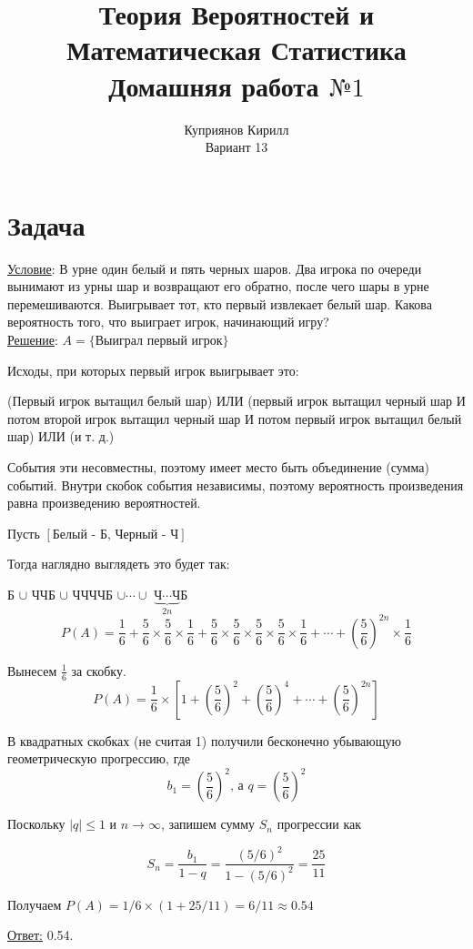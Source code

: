 \documentclass[a4paper,12pt]{article} %
\author{Куприянов Кирилл \\ Вариант 13}
\title{Теория Вероятностей и Математическая Статистика\\Домашняя работа $№1$}
\date{}
\begin{document}
\maketitle
\newpage
\section{Задача}
\underline{Условие}: В урне один белый и пять черных шаров. Два игрока по очереди вынимают из урны шар и возвращают его обратно, после чего шары в урне
перемешиваются. Выигрывает тот, кто первый извлекает белый шар. Какова вероятность того, что выиграет игрок, начинающий игру? \\
\underline{Решение}: $A = \{\text{Выиграл первый игрок}\}$

 Исходы, при которых первый игрок выигрывает это:

(Первый игрок вытащил белый шар) ИЛИ (первый игрок вытащил черный шар И потом второй игрок вытащил черный шар И потом первый игрок вытащил белый шар) ИЛИ (и т. д.)

События эти несовместны, поэтому имеет место быть объединение (сумма) событий. Внутри скобок события независимы, поэтому вероятность произведения равна произведению вероятностей.

Пусть $\left[\text{Белый - Б, Черный - Ч}\right]$

Тогда наглядно выглядеть это будет так:

Б $\cup$ ЧЧБ $\cup$ ЧЧЧЧБ $\cup\cdots\cup$ $\underbrace{\text{Ч}\cdots\text{Ч}}_{2n}$Б
\[
P(A) = \frac{1}{6} + \frac{5}{6}\times\frac{5}{6}\times\frac{1}{6} + \frac{5}{6}\times\frac{5}{6}\times\frac{5}{6}\times\frac{5}{6}\times\frac{1}{6}
+\cdots+\left(\frac{5}{6}\right)^{2n}\times\frac{1}{6}
\]

Вынесем $\frac{1}{6}$ за скобку.
\[
P(A) = \frac{1}{6} \times\left[ 1+\left(\frac{5}{6}\right)^2 + \left(\frac{5}{6}\right)^4 + \cdots + \left(\frac{5}{6}\right)^{2n} \right]
\]

В квадратных  скобках (не считая 1) получили бесконечно убывающую геометрическую прогрессию, где
$$b_1 = \left(\frac{5}{6}\right)^2\text{, а } q = \left(\frac{5}{6}\right)^2$$

Поскольку $|q| \leqslant 1$ и $n \rightarrow \infty$, запишем сумму $S_n$ прогрессии как

$$S_n = \frac{b_1}{1-q} = \frac{(5/6)^2}{1-(5/6)^2} = \frac{25}{11}$$

Получаем $P(A) = 1/6\times (1+ 25/11) = 6/11 \approx 0.54$

\begin{flushright}
	\underline{Ответ:} 0.54.
\end{flushright}
\end{document}
